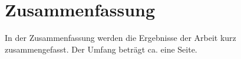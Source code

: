 \chapter{Zusammenfassung}
\label{kap:zusammenfassung}

In der Zusammenfassung werden die Ergebnisse der Arbeit kurz zusammengefasst. Der
Umfang beträgt ca. eine Seite.